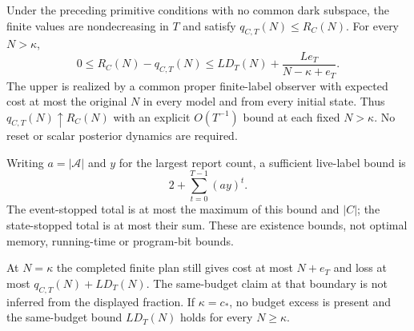 \begin{theorem}\label{thm:primitive-risk}
Under the preceding primitive conditions with no common dark subspace, the finite values are nondecreasing in $T$ and satisfy $q_{C,T}(N)\le R_C(N)$. For every $N>\kappa$,
\begin{equation}\label{eq:primitive-gap}
 0\le R_C(N)-q_{C,T}(N)
 \le L D_T(N)+\frac{L e_T}{N-\kappa+e_T}.
\end{equation}
The upper is realized by a common proper finite-label observer with expected cost at most the original $N$ in every model and from every initial state. Thus $q_{C,T}(N)\uparrow R_C(N)$ with an explicit $O(T^{-1})$ bound at each fixed $N>\kappa$. No reset or scalar posterior dynamics are required.

Writing $a=|\mathcal A|$ and $y$ for the largest report count, a sufficient live-label bound is
\[
 2+\sum_{t=0}^{T-1}(ay)^t.
\]
The event-stopped total is at most the maximum of this bound and $|C|$; the state-stopped total is at most their sum. These are existence bounds, not optimal memory, running-time or program-bit bounds.

At $N=\kappa$ the completed finite plan still gives cost at most $N+e_T$ and loss at most $q_{C,T}(N)+LD_T(N)$. The same-budget claim at that boundary is not inferred from the displayed fraction. If $\kappa=c_*$, no budget excess is present and the same-budget bound $LD_T(N)$ holds for every $N\ge\kappa$.
\end{theorem}
